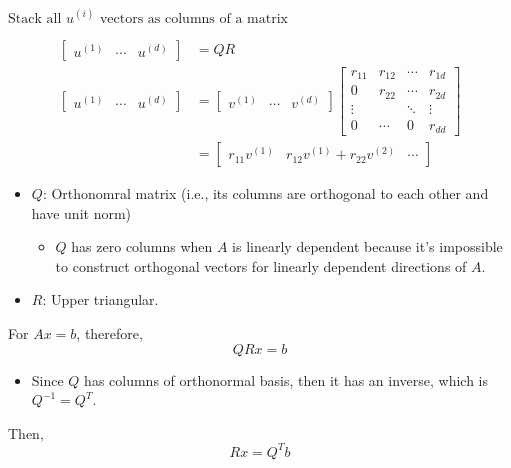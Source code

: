     \begin{definition}
        $\text{Stack all } u^{(i)} \text{ vectors as columns of a matrix}$

        \begin{align*}
            \begin{bmatrix}
            u^{(1)} & \cdots & u^{(d)}
            \end{bmatrix}
            &= QR \\
            \begin{bmatrix}
            u^{(1)} & \cdots & u^{(d)}
            \end{bmatrix}
            &=
            \begin{bmatrix}
            v^{(1)} & \cdots & v^{(d)}
            \end{bmatrix}
            \begin{bmatrix}
            r_{11} & r_{12} & \cdots & r_{1d} \\
            0      & r_{22} & \cdots & r_{2d} \\
            \vdots &        & \ddots & \vdots \\
            0      & \cdots & 0      & r_{dd}
            \end{bmatrix} \\
            &=
            \begin{bmatrix}
            r_{11}v^{(1)} & r_{12}v^{(1)} + r_{22}v^{(2)} & \cdots
            \end{bmatrix}
        \end{align*}        

        \begin{itemize}
            \item \( Q \): Orthonomral matrix (i.e., its columns are orthogonal to each other and have unit norm) 
            \begin{itemize}
                \item $Q$ has zero columns when $A$ is linearly dependent because it's impossible to construct orthogonal vectors for linearly dependent directions of $A$.
            \end{itemize}
            \item \( R \): Upper triangular.
        \end{itemize}        
    \end{definition}
    
    \begin{intuition}
        For $Ax=b$, therefore, 
        \begin{equation*}
            QRx=b
        \end{equation*}
        \begin{itemize}
            \item Since $Q$ has columns of orthonormal basis, then it has an inverse, which is $Q^{-1} = Q^T$. 
        \end{itemize}
        \vspace{1em}

        Then, 
        \begin{equation*}
            Rx=Q^T b
        \end{equation*}
    \end{intuition}

